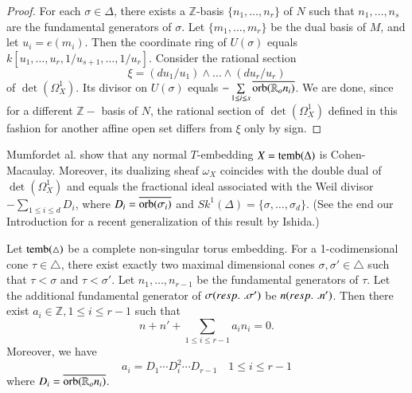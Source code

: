 \begin{proof}
For each $\sigma \in \Delta$, there exists a $\mathbb{Z}$-basis
$\{n_{1}, \ldots , n_{r}\}$ of $N$ such that $n_{1}, \ldots , n_{s}$
are the fundamental generators of $\sigma$. Let $\{m_{1} , \ldots ,
m_{r}\}$ be the dual basis of $M$, and let $u_{i} = e(m_{i})$. Then
the coordinate ring of $U(\sigma)$ equals $k [u_{1} , \ldots , u_{r},
  1/u_{s+1}, \ldots , 1/u_{r}]$. Consider the rational section  
$$
\xi = (du_{1}/ u_{1}) \wedge \ldots \wedge (du_{r}/ u_{r})
$$
of $\det (\Omega^{1}_{X})$. Its divisor on $U(\sigma)$ equals $-
\sum\limits_{1 \leq i \leq s}
\overline{\operatorname{orb}(\mathbb{R}_{o}n_{i})}$. We are done, since for a
different $\mathbb{Z}-$ basis of $N$, the rational section of $\det
(\Omega^{1}_{X})$ defined in this fashion for another affine open set
differs from $\xi$ only by sign.  
\end{proof}

\begin{remark*}
Mumford\pageoriginale et al. \cite[Thm.9, p.29 and Thm.14, p.52]{keyTE}
show that 
any normal $T$-embedding $X = \operatorname{temb} (\Delta)$ is
Cohen-Macaulay. Moreover, its dualizing sheaf $\omega_{X}$
coincides with the double dual of $\det(\Omega^{1}_{X})$ and equals
the fractional ideal associated with the Weil divisor $-
\sum\limits_{1 \leq i \leq d} D_{i}$, where $D_{i} =
\overline{\operatorname{orb}(\sigma_{i})}$ and $Sk^{1} (\Delta) = \{\sigma, \ldots ,
\sigma_{d}\}$. (See the end our Introduction for a recent
generalization of this result by Ishida.)  
\end{remark*}

\begin{prop}\label{chap1:prop6.7} %
Let $ \operatorname{temb} (\triangle)$ be a complete non-singular torus
embedding. For a 1-codimensional cone $\tau \in \triangle$, there
exist exactly two maximal dimensional cones $\sigma, \sigma' \in
\triangle$ such that $\tau < \sigma$ and $\tau < \sigma'$. Let $n_{1},
\ldots , n_{r-1}$ be the fundamental generators of $\tau$. Let the
additional fundamental generator of $\sigma ({resp.}\kern.3em. \sigma')$ be $n
({resp.}\kern.3em. n')$. Then there exist $a_{i} \in \mathbb{Z}, 1 \leq i \leq
r-1$ such that  
$$
n + n' + \sum\limits_{1 \leq i \leq r-1} a_{i}n_{i} = 0.  
$$
Moreover, we have 
$$
a_{i} = D_{1} \cdots D^{2}_{i} \cdots D_{r-1} \quad 1 \leq i \leq r-1 
$$
where $D_{i} = \overline{\operatorname{orb}(\mathbb{R}_{o}n_{i})}$.
\end{prop}

